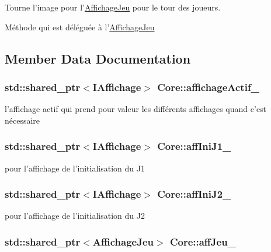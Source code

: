 Tourne l'image pour l'\hyperlink{classAffichageJeu}{Affichage\+Jeu} pour le tour des joueurs. 

Méthode qui est déléguée à l'\hyperlink{classAffichageJeu}{Affichage\+Jeu} 

\subsection{Member Data Documentation}
\hypertarget{classCore_ace6812af8ec428d12258d5c895a1fb2d}{
\subsubsection[{affichage\+Actif\+\_\+}]{\setlength{\rightskip}{0pt plus 5cm}std\+::shared\+\_\+ptr$<${\bf I\+Affichage}$>$ Core\+::affichage\+Actif\+\_\+\hspace{0.3cm}{\ttfamily [protected]}}}\label{classCore_ace6812af8ec428d12258d5c895a1fb2d}
l'affichage actif qui prend pour valeur les différents affichages quand c'est nécessaire \hypertarget{classCore_af1b29bd6eb49663e39efff0a91d9c9df}{
\subsubsection[{aff\+Ini\+J1\+\_\+}]{\setlength{\rightskip}{0pt plus 5cm}std\+::shared\+\_\+ptr$<${\bf I\+Affichage}$>$ Core\+::aff\+Ini\+J1\+\_\+\hspace{0.3cm}{\ttfamily [protected]}}}\label{classCore_af1b29bd6eb49663e39efff0a91d9c9df}
pour l'affichage de l'initialisation du J1 \hypertarget{classCore_a4d85e8590561c684900e1a2fd18184e2}{
\subsubsection[{aff\+Ini\+J2\+\_\+}]{\setlength{\rightskip}{0pt plus 5cm}std\+::shared\+\_\+ptr$<${\bf I\+Affichage}$>$ Core\+::aff\+Ini\+J2\+\_\+\hspace{0.3cm}{\ttfamily [protected]}}}\label{classCore_a4d85e8590561c684900e1a2fd18184e2}
pour l'affichage de l'initialisation du J2 \hypertarget{classCore_a2558f752fb1c060782d4f75d9d09b864}{
\subsubsection[{aff\+Jeu\+\_\+}]{\setlength{\rightskip}{0pt plus 5cm}std\+::shared\+\_\+ptr$<${\bf Affichage\+Jeu}$>$ Core\+::aff\+Jeu\+\_\+\hspace{0.3cm}{\ttfamily [protected]}}}\label{classCore_a2558f752fb1c060782d4f75d9d09b864}
